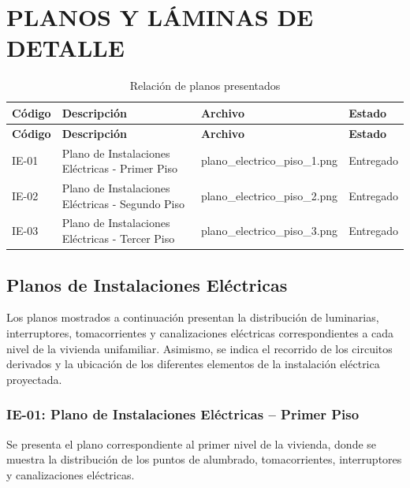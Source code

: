 
\chapter{PLANOS Y LÁMINAS DE DETALLE}

\begin{landscape}
	\begin{longtable}{L{1.6cm}L{5.5cm}L{4.5cm}L{2cm}}
		\caption{Relación de planos presentados}
		\label{tab:planos}\\
		
		\toprule
		\textbf{Código} & \textbf{Descripción} & \textbf{Archivo} & \textbf{Estado} \\
		\midrule
		\endfirsthead
		
		\toprule
		\textbf{Código} & \textbf{Descripción} & \textbf{Archivo} & \textbf{Estado} \\
		\midrule
		\endhead
		
		IE-01 &
		Plano de Instalaciones Eléctricas - Primer Piso &
		plano\_electrico\_piso\_1.png &
		Entregado \\
		
		IE-02 &
		Plano de Instalaciones Eléctricas - Segundo Piso &
		plano\_electrico\_piso\_2.png &
		Entregado \\
		
		IE-03 &
		Plano de Instalaciones Eléctricas - Tercer Piso &
		plano\_electrico\_piso\_3.png &
		Entregado \\
		
		\bottomrule
	\end{longtable}
\end{landscape}

\section{Planos de Instalaciones Eléctricas}

Los planos mostrados a continuación presentan la distribución de luminarias, interruptores, tomacorrientes y canalizaciones eléctricas correspondientes a cada nivel de la vivienda unifamiliar. Asimismo, se indica el recorrido de los circuitos derivados y la ubicación de los diferentes elementos de la instalación eléctrica proyectada.

\subsection{IE-01: Plano de Instalaciones Eléctricas – Primer Piso}

Se presenta el plano correspondiente al primer nivel de la vivienda, donde se muestra la distribución de los puntos de alumbrado, tomacorrientes, interruptores y canalizaciones eléctricas.


